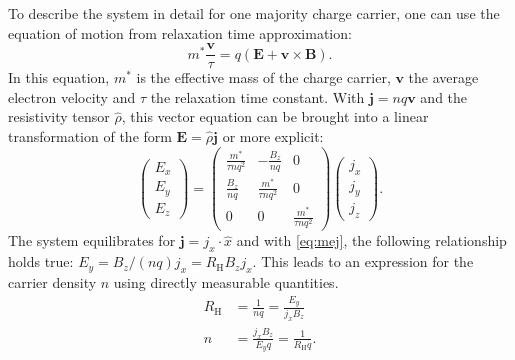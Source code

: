 To describe the system in detail for one majority charge carrier, one can use the 
equation of motion from relaxation time approximation:
\begin{equation}
	m^{*} \frac{\mathbf{v}}{\tau}=q(\mathbf{E}
	+\mathbf{v}\times \mathbf{B}).
\end{equation}
In this equation, $m^{*}$ is the effective mass of the charge carrier, $\mathbf{v}$ the
average electron velocity and $\tau$ the relaxation time constant.
With $\mathbf{j}=nq\mathbf{v}$ and the resistivity tensor $\hat{\rho}$, 
this vector equation can be brought into a linear transformation of the form
$\mathbf{E}=\hat{\rho}\mathbf{j}$ or more explicit:
\begin{equation}
	\label{eq:mej}
	\begin{pmatrix}
		E_{x} \\
		E_{y} \\
		E_{z}
	\end{pmatrix}
	=
	\begin{pmatrix}
		\frac{m^{*}}{\tau nq^{2}} & - \frac{B_{z}}{nq}        & 0                         \\
		\frac{B_{z}}{nq}          & \frac{m^{*}}{\tau nq^{2}} & 0                         \\
		0                         & 0                         & \frac{m^{*}}{\tau nq^{2}}
	\end{pmatrix}
	\begin{pmatrix}
		j_{x} \\
		j_{y} \\
		j_{z}
	\end{pmatrix}.
\end{equation}
The system equilibrates for $\mathbf{j} = j_x \cdot \hat{x}$ and with \cref{eq:mej}, the following
relationship holds true: $E_{y} = B_{z} / (nq) j_{x} = R_{\mathrm{H}}B_{z}j_{x}$.
This leads to an expression for the carrier density $n$ using directly measurable quantities.
\begin{align}
	R_{\mathrm{H}}&=\frac{1}{nq}=\frac{E_{y}}{j_{x}B_{z}}
	\label{eq:hall_coefficient} \\
	n&=\frac{j_{x}B_{z}}{E_{y}q} = \frac{1}{R_{\mathrm{H}}q}.
	\label{eq:hall_concentration}
\end{align}


